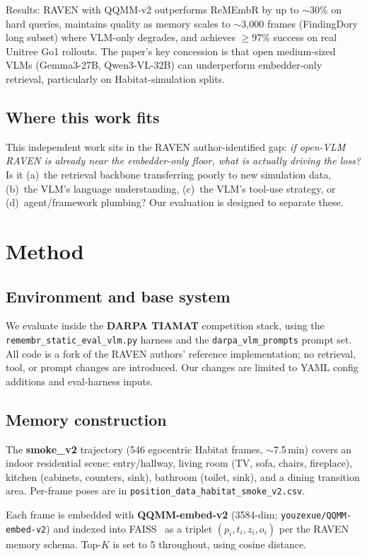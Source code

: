 \documentclass[11pt]{article}
\begin{document}
Results: RAVEN with QQMM-v2 outperforms ReMEmbR by up to $\sim$30\% on hard queries, maintains quality as memory scales to $\sim$3{,}000 frames (FindingDory long subset) where VLM-only degrades, and achieves $\geq$97\% success on real Unitree Go1 rollouts. The paper's key concession is that open medium-sized VLMs (Gemma3-27B, Qwen3-VL-32B) can underperform embedder-only retrieval, particularly on Habitat-simulation splits.

\subsection{Where this work fits}
This independent work sits in the RAVEN author-identified gap: \emph{if open-VLM RAVEN is already near the embedder-only floor, what is actually driving the loss?} Is it (a)~the retrieval backbone transferring poorly to new simulation data, (b)~the VLM's language understanding, (c)~the VLM's tool-use strategy, or (d)~agent/framework plumbing? Our evaluation is designed to separate these.

\section{Method}

\subsection{Environment and base system}
We evaluate inside the \textbf{DARPA TIAMAT} competition stack, using the \texttt{remembr\_static\_eval\_vlm.py} harness and the \texttt{darpa\_vlm\_prompts} prompt set. All code is a fork of the RAVEN authors' reference implementation; no retrieval, tool, or prompt changes are introduced. Our changes are limited to YAML config additions and eval-harness inputs.

\subsection{Memory construction}
The \textbf{smoke\_v2} trajectory (546 egocentric Habitat frames, $\sim$7.5\,min) covers an indoor residential scene: entry/hallway, living room (TV, sofa, chairs, fireplace), kitchen (cabinets, counters, sink), bathroom (toilet, sink), and a dining transition area. Per-frame poses are in \texttt{position\_data\_habitat\_smoke\_v2.csv}.

Each frame is embedded with \textbf{QQMM-embed-v2} (3584-dim;  \texttt{youzexue/QQMM-embed-v2}) and indexed into FAISS~\cite{johnson2019faiss} as a triplet $(p_i, t_i, z_i, o_i)$ per the RAVEN memory schema. Top-$K$ is set to 5 throughout, using cosine distance.
\end{document}
